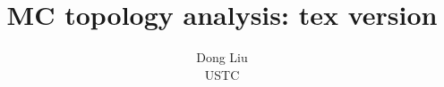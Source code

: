 \documentclass[11pt]{article}
\begin{document}
\title{MC topology analysis: tex version}
\author{Dong Liu\\
\small{ USTC}}
\maketitle
\end{document}
